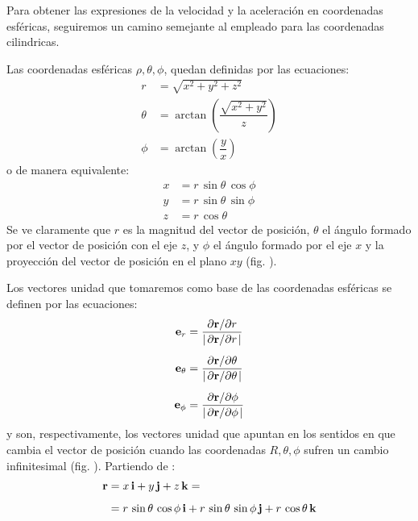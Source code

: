 \documentclass[12pt]{article}
\begin{document}
Para obtener las expresiones de la velocidad y la aceleración en coordenadas esféricas, seguiremos un camino semejante al empleado para las coordenadas cilindricas. 
\par
Las coordenadas esféricas $\rho, \theta, \phi$, quedan definidas por las ecuaciones:
\begin{align}
r &= \sqrt{x^{2} + y^{2} + z^{2}} \label{eq:ecuacion_02_30} \\
\theta &= \arctan \left( \dfrac{\sqrt{x^{2} + y^{2}}}{z} \right) \label{eq:ecuacion_02_31} \\
\phi &= \arctan \left( \dfrac{y}{x} \right) \label{eq:ecuacion_02_32}
\end{align}
o de manera equivalente:
\begin{align}
    x &= r \, \sin \theta \, \cos \phi \label{eq:ecuacion_02_33} \\
    y &= r \, \sin \theta \, \sin \phi \label{eq:ecuacion_02_34} \\
    z &= r \, \cos \theta \label{eq:ecuacion_02_35}
\end{align}
Se ve claramente que $r$ es la magnitud del vector de posición, $\theta$ el ángulo formado por el vector de posición con el eje $z$, y $\phi$ el ángulo formado por el eje $x$ y la proyección del vector de posición en el plano $x y$ (fig. ). 
\par
Los vectores unidad que tomaremos como base de las coordenadas esféricas se definen por las ecuaciones:
\begin{align}
\vb{e}_{r} &= \dfrac{\pdv*{\vb{r}}{r}}{\abs{\pdv*{\vb{r}}{r}}} \label{eq:ecuacion_02_36} \\[0.5em]
\vb{e}_{\theta} &= \dfrac{\pdv*{\vb{r}}{\theta}}{\abs{\pdv*{\vb{r}}{\theta}}} \label{eq:ecuacion_02_37} \\[0.5em]
\vb{e}_{\phi} &= \dfrac{\pdv*{\vb{r}}{\phi}}{\abs{\pdv*{\vb{r}}{\phi}}} \label{eq:ecuacion_02_38}
\end{align}
y son, respectivamente, los vectores unidad que apuntan en los sentidos en que cambia el vector de posición cuando las coordenadas $R, \theta, \phi$ sufren un cambio infinitesimal (fig. ). Partiendo de :
\begin{align}
\begin{aligned}
\vb{r} &= x \, \vb{i} + y \, \vb{j} + z \, \vb{k} = \\[0.5em]
&= r \, \sin \theta \, \cos \phi \, \vb{i} + r \, \sin \theta \, \sin \phi \, \vb{j} + r \, \cos \theta \, \vb{k}
\end{aligned}
\label{eq:ecuacion_02_39}
\end{align}
\end{document}
